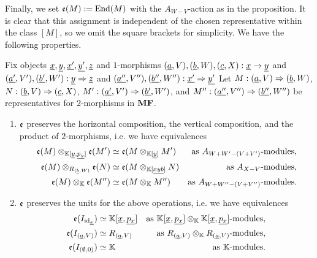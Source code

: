 Finally, we set $\mathfrak{e}(M) := \mathrm{End}(M)$ with the $A_{W - V}$-action as in the proposition. It is clear that this assignment is independent of the chosen representative within the class $[M]$, so we omit the square brackets for simplicity. We have the following properties.
\begin{prp} \label{prp:functoriality-2cells}
	Fix objects $\underline{x}, \underline{y}, \underline{x'}, \underline{y'}, \underline{z}$ and $1$-morphisms $(\underline{a}, V), (\underline{b}, W), (\underline{c}, X) : \underline{x} \to \underline{y}$ and $(\underline{a'}, V'), (\underline{b'}, W') : \underline{y} \Rightarrow \underline{z}$ and $(\underline{a''}, V''), (\underline{b''}, W'') : \underline{x'} \Rightarrow \underline{y'}$ Let $M : (\underline{a}, V) \Rightarrow (\underline{b}, W)$, $N : (\underline{b}, V) \Rightarrow (\underline{c}, X)$, $M' : (\underline{a'}, V') \Rightarrow (\underline{b'}, W')$, and $M'' : (\underline{a''}, V'') \Rightarrow (\underline{b''}, W'')$ be representatives for $2$-morphisms in $\mathbf{MF}$.
	\begin{enumerate}
		\item $\mathfrak{e}$ preserves the horizontal composition, the vertical composition, and the product of $2$-morphisms, i.e. we have equivalences
		\begin{align*}
			\mathfrak{e}(M) \otimes_{\mathbb{K}[\underline{y}, \underline{p_y}]} \mathfrak{e}(M') & \simeq \mathfrak{e}(M \otimes_{\mathbb{K}[\underline{y}]} M') & \text{as $A_{W + W' - (V + V')}$-modules}, \\
			\mathfrak{e}(M) \otimes_{R_{(\underline{b}, W)}} \mathfrak{e}(N) & \simeq \mathfrak{e}(M \otimes_{\mathbb{K}[\underline{xyb}]} N) & \text{as $A_{X - V}$-modules}, \\
			\mathfrak{e}(M) \otimes_{\mathbb{K}} \mathfrak{e}(M'') & \simeq \mathfrak{e}(M \otimes_{\mathbb{K}} M'') & \text{as $A_{W + W'' - (V + V'')}$-modules}.
		\end{align*}
		\item $\mathfrak{e}$ preserves the units for the above operations, i.e. we have equivalences
		\begin{align*}
			\mathfrak{e}(I_{\mathrm{id}_{\underline{x}}}) & \simeq \mathbb{K}[\underline{x}, \underline{p_x}] & \text{as $\mathbb{K}[\underline{x}, \underline{p_x}] \otimes_{\mathbb{K}} \mathbb{K}[\underline{x}, \underline{p_x}]$-modules}, \\
			\mathfrak{e}(I_{(\underline{a}, V)}) & \simeq R_{(\underline{a}, V)} & \text{as $R_{(\underline{a}, V)} \otimes_{\mathbb{K}} R_{(\underline{a}, V)}$-modules}, \\
			\mathfrak{e}(I_{(\emptyset, 0)}) & \simeq \mathbb{K} & \text{as $\mathbb{K}$-modules}.
		\end{align*}
	\end{enumerate}
\end{prp}

